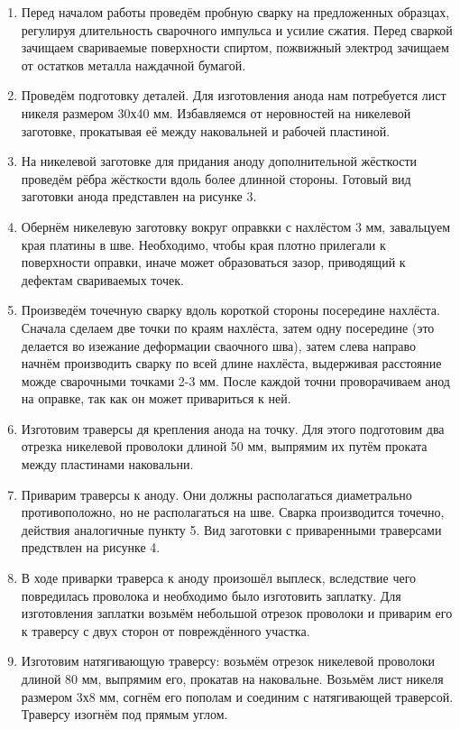 \documentclass[12pt]{article}
\begin{document}
\begin{enumerate}
    \item Перед началом работы проведём пробную сварку на предложенных образцах, регулируя длительность сварочного импульса и усилие сжатия. Перед сваркой зачищаем свариваемые поверхности спиртом, пожвижный электрод зачищаем от остатков металла наждачной бумагой.
    \item Проведём подготовку деталей. Для изготовления анода нам потребуется лист никеля размером 30х40 мм. Избавляемся от неровностей на никелевой заготовке, прокатывая её между наковальней и рабочей пластиной. 
    \item На никелевой заготовке для придания аноду дополнительной жёсткости проведём рёбра жёсткости вдоль более длинной стороны. Готовый вид заготовки анода представлен на рисунке 3.
    \item Обернём никелевую заготовку вокруг оправкки с нахлёстом 3 мм, завальцуем края платины в шве. Необходимо, чтобы края плотно прилегали к поверхности оправки, иначе может образоваться зазор, приводящий к дефектам свариваемых точек.
    \item Произведём точечную сварку вдоль короткой стороны посередине нахлёста. Сначала сделаем две точки по краям нахлёста, затем одну посередине (это делается во изежание деформации сваочного шва), затем слева направо начнём производить сварку по всей длине нахлёста, выдерживая расстояние можде сварочными точками 2-3 мм. После каждой точни проворачиваем анод на оправке, так как он может привариться к ней.
    \item Изготовим траверсы дя крепления анода на точку. Для этого подготовим два отрезка никелевой проволоки длиной 50 мм, выпрямим их путём проката между пластинами наковальни. 
    \item Приварим траверсы к аноду. Они должны располагаться диаметрально противоположно, но не располагаться на шве. Сварка производится точечно, действия аналогичные пункту 5. Вид заготовки с приваренными траверсами предствлен на рисунке 4.
    \item В ходе приварки траверса к аноду произошёл выплеск, вследствие чего повредилась проволока и необходимо было изготовить заплатку. Для изготовления заплатки возьмём небольшой отрезок проволоки и приварим его к траверсу с двух сторон от повреждённого участка.
    \item Изготовим натягивающую траверсу: возьмём отрезок никелевой проволоки длиной 80 мм, выпрямим его, прокатав на наковальне. Возьмём лист никеля размером 3х8 мм, согнём его пополам и соединим с натягивающей траверсой. Траверсу изогнём под прямым углом. 
\end{enumerate}
\end{document}
